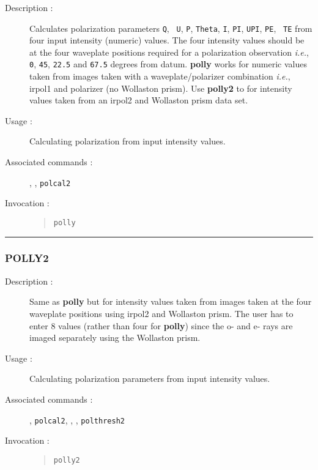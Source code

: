 \begin{description}

\item[Description :] Calculates polarization parameters {\tt Q}, {\tt
U}, {\tt P}, {\tt Theta}, {\tt I}, {\tt PI}, {\tt UPI}, {\tt PE}, {\tt
TE} from four input intensity (numeric) values.  The four intensity
values should be at the four waveplate positions required for a
polarization observation \emph{i.e.}, {\tt 0}, {\tt 45}, {\tt 22.5} and
{\tt 67.5} degrees from datum.  {\bf polly} works for numeric values
taken from images taken with a waveplate/polarizer combination
\emph{i.e.}, {\sc irpol1} and polarizer (no Wollaston prism).  Use {\bf
polly2} to for intensity values taken from an {\sc irpol2} and Wollaston
prism data set.

\item[Usage :] Calculating polarization from input intensity values.

\item[Associated commands :] {\tt {}},
{\tt {}}, {\tt polcal2}

\item[Invocation :]

\begin{quote}{\tt  polly }\end{quote}

\end{description}

\hrule
\subsubsection*{\label{POLLY2}POLLY2}

\begin{description}

\item[Description :] Same as {\bf polly} but for intensity values taken
from images taken at the four waveplate positions using {\sc irpol2}
and Wollaston prism.  The user has to enter 8 values (rather than four
for {\bf polly}) since the o- and e- rays are imaged separately using
the Wollaston prism.

\item[Usage :] Calculating polarization parameters from input intensity values.

\item[Associated commands :] {\tt {}},
{\tt polcal2}, {\tt {}},
{\tt {}}, {\tt polthresh2}

\item[Invocation :]

\begin{quote}{\tt  polly2 }\end{quote}

\end{description}

